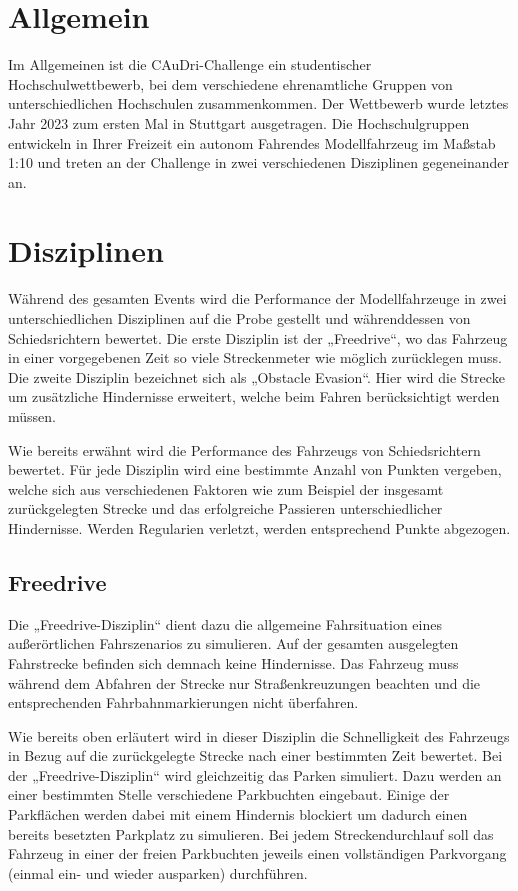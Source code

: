 \section{Allgemein}
Im Allgemeinen ist die CAuDri-Challenge ein studentischer Hochschulwettbewerb, bei dem verschiedene
ehrenamtliche Gruppen von unterschiedlichen Hochschulen zusammenkommen. Der Wettbewerb wurde letztes Jahr 2023
zum ersten Mal in Stuttgart ausgetragen. Die Hochschulgruppen entwickeln in Ihrer Freizeit ein autonom Fahrendes
Modellfahrzeug im Maßstab 1:10 und treten an der Challenge in zwei verschiedenen Disziplinen gegeneinander an.

\section{Disziplinen} 
Während des gesamten Events wird die Performance der Modellfahrzeuge in zwei unterschiedlichen
Disziplinen auf die Probe gestellt und währenddessen von Schiedsrichtern bewertet. Die erste Disziplin ist der
„Freedrive“, wo das Fahrzeug in einer vorgegebenen Zeit so viele Streckenmeter wie möglich zurücklegen
muss. Die zweite Disziplin bezeichnet sich als „Obstacle Evasion“. Hier wird die Strecke um zusätzliche
Hindernisse erweitert, welche beim Fahren berücksichtigt werden müssen.

Wie bereits erwähnt wird die Performance des Fahrzeugs von Schiedsrichtern bewertet. Für jede Disziplin wird
eine bestimmte Anzahl von Punkten vergeben, welche sich aus verschiedenen Faktoren wie zum Beispiel der insgesamt
zurückgelegten Strecke und das erfolgreiche Passieren unterschiedlicher Hindernisse. Werden Regularien verletzt,
werden entsprechend Punkte abgezogen.  

\subsection{Freedrive} Die „Freedrive-Disziplin“ dient dazu die allgemeine
Fahrsituation eines außerörtlichen Fahrszenarios zu simulieren. Auf der gesamten ausgelegten Fahrstrecke befinden
sich demnach keine Hindernisse. Das Fahrzeug muss während dem Abfahren der Strecke nur Straßenkreuzungen beachten
und die entsprechenden Fahrbahnmarkierungen nicht überfahren.

Wie bereits oben erläutert wird in dieser Disziplin die Schnelligkeit des Fahrzeugs in Bezug auf die zurückgelegte
Strecke nach einer bestimmten Zeit bewertet. Bei der „Freedrive-Disziplin“ wird gleichzeitig das Parken
simuliert. Dazu werden an einer bestimmten Stelle verschiedene Parkbuchten eingebaut. Einige der Parkflächen
werden dabei mit einem Hindernis blockiert um dadurch einen bereits besetzten Parkplatz zu simulieren. Bei jedem
Streckendurchlauf soll das Fahrzeug in einer der freien Parkbuchten jeweils einen vollständigen Parkvorgang
(einmal ein- und wieder ausparken) durchführen.

